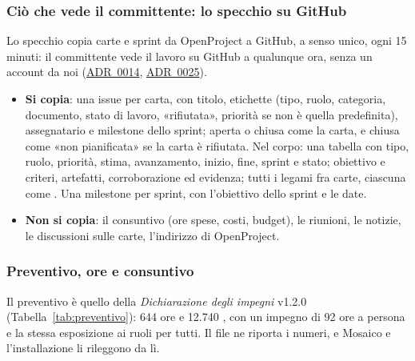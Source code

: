 \documentclass[a4paper, 11pt]{article}
\newcommand{\adr}[1]{\hyperref[adr:#1]{ADR~#1}}
\begin{document}
\subsubsection{Ciò che vede il committente: lo specchio su GitHub}\label{sec:specchio}
Lo specchio copia carte e sprint da OpenProject a GitHub, a senso unico, ogni 15 minuti: il committente vede il lavoro su GitHub a qualunque ora, senza un account da noi (\adr{0014}, \adr{0025}).
\begin{itemize}
    \item \textbf{Si copia}: una issue per carta, con titolo, etichette (tipo, ruolo, categoria, documento, stato di lavoro, «rifiutata», priorità se non è quella predefinita), assegnatario e milestone dello sprint; aperta o chiusa come la carta, e chiusa come «non pianificata» se la carta è rifiutata. Nel corpo: una tabella con tipo, ruolo, priorità, stima, avanzamento, inizio, fine, sprint e stato; obiettivo e criteri, artefatti, corroborazione ed evidenza; tutti i legami fra carte, ciascuna come . Una milestone per sprint, con l'obiettivo dello sprint e le date.
    \item \textbf{Non si copia}: il consuntivo (ore spese, costi, budget), le riunioni, le notizie, le discussioni sulle carte, l'indirizzo di OpenProject.
\end{itemize}
\begin{norme}
\end{norme}

\subsubsection{Preventivo, ore e consuntivo}\label{sec:impegni}
Il preventivo è quello della \emph{Dichiarazione degli impegni} v1.2.0 (Tabella~\ref{tab:preventivo}): 644 ore e 12.740 \texteuro, con un impegno di 92 ore a persona e la stessa esposizione ai ruoli per tutti. Il file  ne riporta i numeri, e Mosaico e l'installazione li rileggono da lì.
\end{document}
